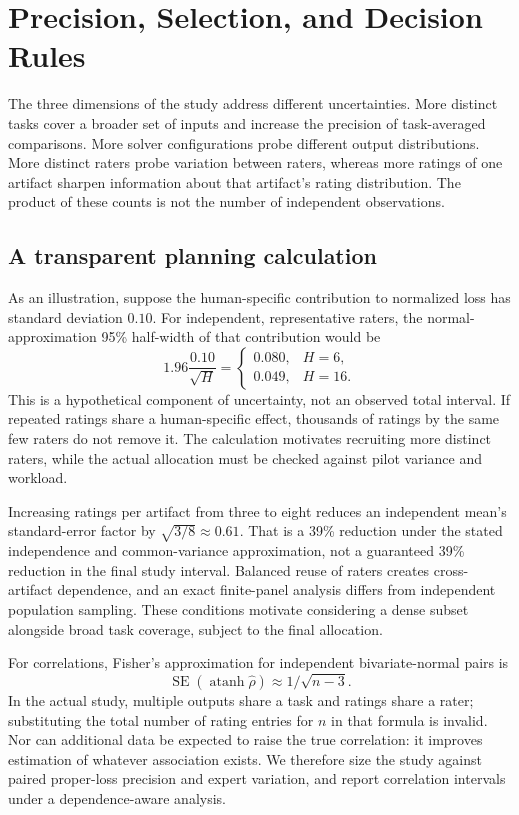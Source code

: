 \section{Precision, Selection, and Decision Rules}
\label{sec:inference}
The three dimensions of the study address different uncertainties.
More distinct tasks cover a broader set of inputs and increase the precision of task-averaged comparisons.
More solver configurations probe different output distributions.
More distinct raters probe variation between raters, whereas more ratings of one artifact sharpen information about that artifact's rating distribution.
The product of these counts is not the number of independent observations.

\subsection{A transparent planning calculation}
As an illustration, suppose the human-specific contribution to normalized loss has standard deviation $0.10$.
For independent, representative raters, the normal-approximation 95\% half-width of that contribution would be
\begin{equation}
 1.96\frac{0.10}{\sqrt H}
 =\begin{cases}0.080,&H=6,\\0.049,&H=16.\end{cases}
\end{equation}
This is a hypothetical component of uncertainty, not an observed total interval.
If repeated ratings share a human-specific effect, thousands of ratings by the same few raters do not remove it.
The calculation motivates recruiting more distinct raters, while the actual allocation must be checked against pilot variance and workload.

Increasing ratings per artifact from three to eight reduces an independent mean's standard-error factor by $\sqrt{3/8}\approx0.61$.
That is a 39\% reduction under the stated independence and common-variance approximation, not a guaranteed 39\% reduction in the final study interval.
Balanced reuse of raters creates cross-artifact dependence, and an exact finite-panel analysis differs from independent population sampling.
These conditions motivate considering a dense subset alongside broad task coverage, subject to the final allocation.

For correlations, Fisher's approximation for independent bivariate-normal pairs is
\begin{equation}
 \operatorname{SE}(\operatorname{atanh}\widehat\rho)\approx1/\sqrt{n-3}.
\end{equation}
In the actual study, multiple outputs share a task and ratings share a rater; substituting the total number of rating entries for $n$ in that formula is invalid.
Nor can additional data be expected to raise the true correlation: it improves estimation of whatever association exists.
We therefore size the study against paired proper-loss precision and expert variation, and report correlation intervals under a dependence-aware analysis.

